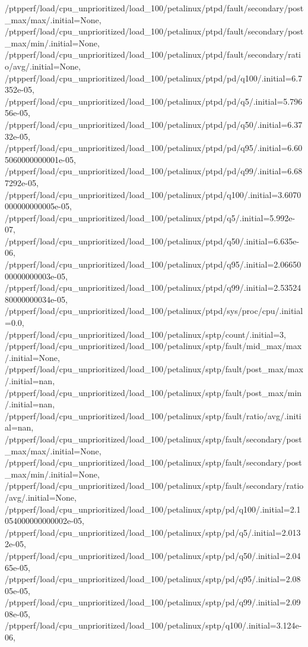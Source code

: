 {    /ptpperf/load/cpu_unprioritized/load_100/petalinux/ptpd/fault/secondary/post_max/max/.initial=None,
    /ptpperf/load/cpu_unprioritized/load_100/petalinux/ptpd/fault/secondary/post_max/min/.initial=None,
    /ptpperf/load/cpu_unprioritized/load_100/petalinux/ptpd/fault/secondary/ratio/avg/.initial=None,
    /ptpperf/load/cpu_unprioritized/load_100/petalinux/ptpd/pd/q100/.initial=6.7352e-05,
    /ptpperf/load/cpu_unprioritized/load_100/petalinux/ptpd/pd/q5/.initial=5.79656e-05,
    /ptpperf/load/cpu_unprioritized/load_100/petalinux/ptpd/pd/q50/.initial=6.3732e-05,
    /ptpperf/load/cpu_unprioritized/load_100/petalinux/ptpd/pd/q95/.initial=6.605060000000001e-05,
    /ptpperf/load/cpu_unprioritized/load_100/petalinux/ptpd/pd/q99/.initial=6.687292e-05,
    /ptpperf/load/cpu_unprioritized/load_100/petalinux/ptpd/q100/.initial=3.6070000000000005e-05,
    /ptpperf/load/cpu_unprioritized/load_100/petalinux/ptpd/q5/.initial=5.992e-07,
    /ptpperf/load/cpu_unprioritized/load_100/petalinux/ptpd/q50/.initial=6.635e-06,
    /ptpperf/load/cpu_unprioritized/load_100/petalinux/ptpd/q95/.initial=2.0665000000000003e-05,
    /ptpperf/load/cpu_unprioritized/load_100/petalinux/ptpd/q99/.initial=2.5352480000000034e-05,
    /ptpperf/load/cpu_unprioritized/load_100/petalinux/ptpd/sys/proc/cpu/.initial=0.0,
    /ptpperf/load/cpu_unprioritized/load_100/petalinux/sptp/count/.initial=3,
    /ptpperf/load/cpu_unprioritized/load_100/petalinux/sptp/fault/mid_max/max/.initial=None,
    /ptpperf/load/cpu_unprioritized/load_100/petalinux/sptp/fault/post_max/max/.initial=nan,
    /ptpperf/load/cpu_unprioritized/load_100/petalinux/sptp/fault/post_max/min/.initial=nan,
    /ptpperf/load/cpu_unprioritized/load_100/petalinux/sptp/fault/ratio/avg/.initial=nan,
    /ptpperf/load/cpu_unprioritized/load_100/petalinux/sptp/fault/secondary/post_max/max/.initial=None,
    /ptpperf/load/cpu_unprioritized/load_100/petalinux/sptp/fault/secondary/post_max/min/.initial=None,
    /ptpperf/load/cpu_unprioritized/load_100/petalinux/sptp/fault/secondary/ratio/avg/.initial=None,
    /ptpperf/load/cpu_unprioritized/load_100/petalinux/sptp/pd/q100/.initial=2.1054000000000002e-05,
    /ptpperf/load/cpu_unprioritized/load_100/petalinux/sptp/pd/q5/.initial=2.0132e-05,
    /ptpperf/load/cpu_unprioritized/load_100/petalinux/sptp/pd/q50/.initial=2.0465e-05,
    /ptpperf/load/cpu_unprioritized/load_100/petalinux/sptp/pd/q95/.initial=2.0805e-05,
    /ptpperf/load/cpu_unprioritized/load_100/petalinux/sptp/pd/q99/.initial=2.0908e-05,
    /ptpperf/load/cpu_unprioritized/load_100/petalinux/sptp/q100/.initial=3.124e-06,
}
